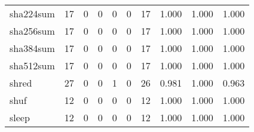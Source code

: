 \begin{longtable}{lp{2.0cm}p{2.0cm}p{2.0cm}p{2.0cm}p{2.0cm}p{2.0cm}p{2.0cm}p{2.0cm}p{2.0cm}}
sha224sum &                     17 &                                             0 &                                            0 &                                           0 &                                            0 &                                         17 &                                1.000 &                                  1.000 &                                1.000 \\
sha256sum &                     17 &                                             0 &                                            0 &                                           0 &                                            0 &                                         17 &                                1.000 &                                  1.000 &                                1.000 \\
sha384sum &                     17 &                                             0 &                                            0 &                                           0 &                                            0 &                                         17 &                                1.000 &                                  1.000 &                                1.000 \\
sha512sum &                     17 &                                             0 &                                            0 &                                           0 &                                            0 &                                         17 &                                1.000 &                                  1.000 &                                1.000 \\
shred     &                     27 &                                             0 &                                            0 &                                           1 &                                            0 &                                         26 &                                0.981 &                                  1.000 &                                0.963 \\
shuf      &                     12 &                                             0 &                                            0 &                                           0 &                                            0 &                                         12 &                                1.000 &                                  1.000 &                                1.000 \\
sleep     &                     12 &                                             0 &                                            0 &                                           0 &                                            0 &                                         12 &                                1.000 &                                  1.000 &                                1.000 \\

\end{longtable}
